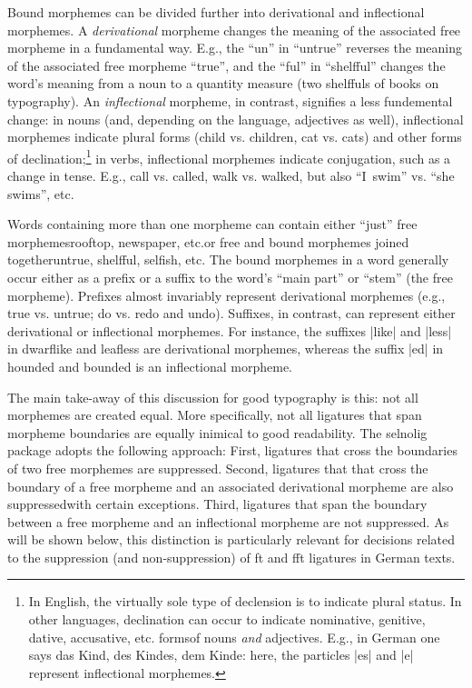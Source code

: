 \documentclass[11pt]{article}
\newcommand{\pkg}[1]{\textsf{#1}}
\begin{document}
Bound morphemes can be divided further into derivational and inflectional morphemes. A \emph{derivational} morpheme changes the meaning of the associated free morpheme in a fundamental way. E.g., the \enquote{un} in \enquote{untrue} reverses the meaning of the associated free morpheme \enquote{true}, and the \enquote{ful} in \enquote{shelfful} changes the word's meaning from a noun to a quantity measure (two shelffuls of books on typography). An \emph{inflectional} morpheme, in contrast, signifies a less fundemental change: in nouns (and, depending on the language, adjectives as well), inflectional morphemes indicate plural forms (child vs. children, cat vs. cats) and other forms of declination;\footnote{In English, the virtually sole type of declension is to indicate plural status. In other languages, declination can occur to indicate nominative, genitive, dative, accusative, etc. forms\textemdash of nouns \emph{and} adjectives. E.g., in German one says das Kind, des Kindes, dem Kinde: here, the particles |es| and |e| represent inflectional morphemes.} in verbs, inflectional morphemes indicate conjugation, such as a change in tense. E.g., call vs. called, walk vs. walked, but also \enquote{I~swim} vs. \enquote{she swims}, etc. 

Words containing more than one morpheme can contain either \enquote{just} free morphemes\textemdash rooftop, newspaper, etc.\textemdash or free and bound morphemes joined together\textemdash untrue, shelfful, sel\mbox{fi}sh, etc. The bound morphemes in a word generally occur either as a prefix or a suffix to the word's \enquote{main part} or \enquote{stem} (the free morpheme). Prefixes almost invariably represent derivational morphemes (e.g., true vs. untrue; do vs. redo and undo). Suffixes, in contrast, can represent either derivational or inflectional morphemes. For instance, the suffixes |like| and |less| in dwarflike and leafless are derivational morphemes, whereas the suffix |ed| in hounded and bounded is an inflectional morpheme. 

The main take-away of this discussion for good typography is this: not all morphemes are created equal. More specifically, not all ligatures that span morpheme boundaries are equally inimical to good readability. The \pkg{selnolig} package adopts the following approach: First, ligatures that cross the boundaries of two free morphemes are suppressed. Second, ligatures that that cross the boundary of a free morpheme and an associated derivational morpheme are also suppressed\textemdash with certain exceptions. Third, ligatures that span the boundary between a free morpheme and an inflectional morpheme are not suppressed. As will be shown below, this distinction is particularly relevant for decisions related to the suppression (and non-suppression) of ft and fft ligatures in German texts.
\end{document}
